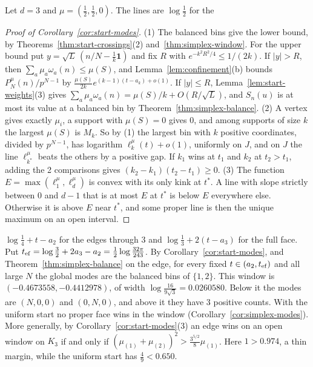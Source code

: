 \begin{example}\label{ex:K3-start}
Let $d=3$ and $\mu=(\frac12,\frac12,0)$. The lines are $\log\frac12$ for the

\begin{proof}[Proof of Corollary~\ref{cor:start-modes}]
(1) The balanced bins give the lower bound, by
Theorems~\ref{thm:start-crossings}(2) and~\ref{thm:simplex-window}. For the upper
bound put $y=\sqrt L\,(n/N-\frac1k\mathbf 1)$ and fix $R$ with
$e^{-k^2R^2/4}\le1/(2k)$. If $|y|>R$, then $\sum_a\mu_a\omega_a(n)\le\mu(S)$,
and Lemma~\ref{lem:confinement}(b) bounds $P^\mu_N(n)/p^{N-1}$ by
$\frac{\mu(S)}{2k}e^{(k-1)(t-a_k)+o(1)}$. If $|y|\le R$,
Lemma~\ref{lem:start-weights}(3) gives
$\sum_a\mu_a\omega_a(n)=\mu(S)/k+O(R/\sqrt L)$, and $S_n(u)$ is at most its
value at a balanced bin by Theorem~\ref{thm:simplex-balance}.
(2) A vertex gives exactly $\mu_i$, a support with $\mu(S)=0$ gives 0, and among
supports of size $k$ the largest $\mu(S)$ is $M_k$. So by (1) the largest bin
with $k$ positive coordinates, divided by $p^{N-1}$, has logarithm
$\ell^\mu_k(t)+o(1)$, uniformly on $J$, and on $J$ the line $\ell^\mu_{k^*}$ beats
the others by a positive gap. If $k_1$ wins at $t_1$ and $k_2$ at $t_2>t_1$,
adding the 2 comparisons gives $(k_2-k_1)(t_2-t_1)\ge0$.
(3) The function $E=\max(\ell^\mu_1,\ell^\mu_d)$ is convex with its only kink at
$t^*$. A line with slope strictly between 0 and $d-1$ that is at most $E$ at
$t^*$ is below $E$ everywhere else. Otherwise it is above $E$ near $t^*$, and
some proper line is then the unique maximum on an open interval.
\end{proof}

$\log\frac14+t-a_2$ for the edges through 3 and $\log\frac13+2(t-a_3)$ for the
full face. Put $t_{\rm ef}=\log\frac32+2a_3-a_2=\frac12\log\frac{32\pi}{243}$. By
Corollary~\ref{cor:start-modes}, and Theorem~\ref{thm:simplex-balance} on the
edge, for every fixed $t\in(a_2,t_{\rm ef})$ and all large $N$ the global modes
are the balanced bins of $\{1,2\}$. This window is $(-0.4673558,-0.4412978)$, of
width $\log\frac{16}{9\sqrt3}=0.0260580$. Below it the modes are $(N,0,0)$ and
$(0,N,0)$, and above it they have 3 positive counts. With the uniform start no
proper face wins in the window (Corollary~\ref{cor:simplex-modes}). More
generally, by Corollary~\ref{cor:start-modes}(3) an edge wins on an open window
on $K_3$ if and only if $(\mu_{(1)}+\mu_{(2)})^2>\frac{3^{5/2}}8\mu_{(1)}$. Here
$1>0.974$, a thin margin, while the uniform start has $\frac49<0.650$.


\end{example}
